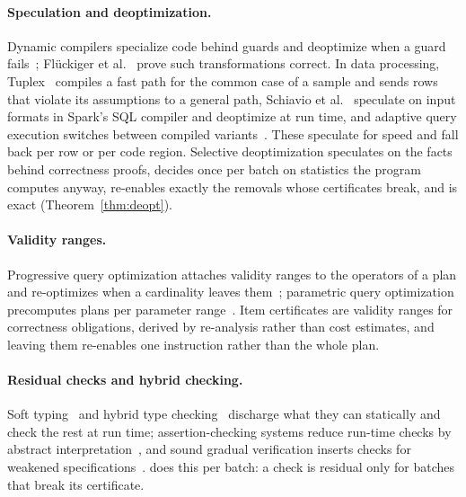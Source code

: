 \paragraph{Speculation and deoptimization.} Dynamic compilers specialize code behind guards and
deoptimize when a guard fails~\cite{holzle1992}; Flückiger et al.~\cite{flueckiger2018} prove such
transformations correct. In data processing, Tuplex~\cite{spiegelberg2021} compiles a fast path for
the common case of a sample and sends rows that violate its assumptions to a general path, Schiavio
et al.~\cite{schiavio2020} speculate on input formats in Spark's SQL compiler and deoptimize at run
time, and adaptive query execution switches between compiled variants~\cite{kohn2018}. These
speculate for speed and fall back per row or per code region. Selective deoptimization speculates on
the facts behind correctness proofs, decides once per batch on statistics the program computes
anyway, re-enables exactly the removals whose certificates break, and is exact
(Theorem~\ref{thm:deopt}).

\paragraph{Validity ranges.} Progressive query optimization attaches validity ranges to the operators
of a plan and re-optimizes when a cardinality leaves them~\cite{markl2004}; parametric query
optimization precomputes plans per parameter range~\cite{ioannidis1992}. Item certificates are
validity ranges for correctness obligations, derived by re-analysis rather than cost estimates, and
leaving them re-enables one instruction rather than the whole plan.

\paragraph{Residual checks and hybrid checking.} Soft typing~\cite{cartwright1991} and hybrid type
checking~\cite{flanagan2006} discharge what they can statically and check the rest at run time;
assertion-checking systems reduce run-time checks by abstract interpretation~\cite{stulova2018}, and
sound gradual verification inserts checks for weakened specifications~\cite{zimmerman2024}. \PL does
this per batch: a check is residual only for batches that break its certificate.

